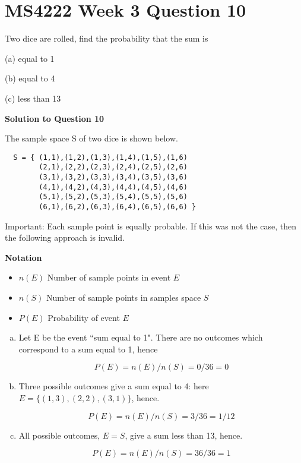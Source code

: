\documentclass[]{article}
\begin{document}
\section*{MS4222 Week 3 Question 10} 

Two dice are rolled, find the probability that the sum is 


(a) equal to 1 

(b) equal to 4 

(c) less than 13



\noindent \textbf{Solution to Question 10}

\noindent The sample space S of two dice is shown below. 

\begin{framed}
\begin{verbatim}
  S = { (1,1),(1,2),(1,3),(1,4),(1,5),(1,6) 
        (2,1),(2,2),(2,3),(2,4),(2,5),(2,6) 
        (3,1),(3,2),(3,3),(3,4),(3,5),(3,6) 
        (4,1),(4,2),(4,3),(4,4),(4,5),(4,6) 
        (5,1),(5,2),(5,3),(5,4),(5,5),(5,6) 
        (6,1),(6,2),(6,3),(6,4),(6,5),(6,6) } 
\end{verbatim}
Important: Each sample point is equally probable. If this was not the case, then the following approach is invalid.
\end{framed}

\noindent \textbf{Notation}
\begin{itemize}
    \item $n(E)$ Number of sample points in event $E$
    \item $n(S)$ Number of sample points in samples space $S$
    \item $P(E)$ Probability of event $E$
\end{itemize}


\begin{enumerate}[(a)]
\item Let E be the event ``sum equal to 1". There are no outcomes which correspond to a sum equal to 1, hence 

\[P(E) = n(E) / n(S) = 0 / 36 = 0 \]

\item Three possible outcomes give a sum equal to 4: here $E = \{(1,3),(2,2),(3,1)\}$, hence. 

\[P(E) = n(E) / n(S) = 3 / 36 = 1 / 12 \]

\item All possible outcomes, $E = S$, give a sum less than 13, hence. 

\[P(E) = n(E) / n(S) = 36 / 36 = 1 \]
\end{enumerate}
\end{document}
